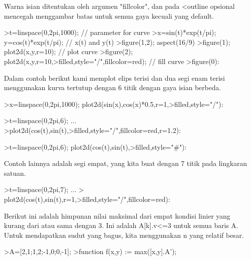 \documentclass{article}
\begin{document}
\begin{eulernotebook}
\begin{eulercomment}
\begin{eulercomment}
\begin{eulercomment}
\begin{eulercomment}
\begin{eulercomment}
Warna isian ditentukan oleh argumen "fillcolor", dan pada \textless{}outline
opsional mencegah menggambar batas untuk semua gaya kecuali yang
default.
\end{eulercomment}
\begin{eulerprompt}
>t=linspace(0,2pi,1000); // parameter for curve
>x=sin(t)*exp(t/pi); y=cos(t)*exp(t/pi); // x(t) and y(t)
>figure(1,2); aspect(16/9)
>figure(1); plot2d(x,y,r=10); // plot curve
>figure(2); plot2d(x,y,r=10,>filled,style="/",fillcolor=red); // fill curve
>figure(0):
\end{eulerprompt}
\begin{eulercomment}
Dalam contoh berikut kami memplot elips terisi dan dua segi enam
terisi menggunakan kurva tertutup dengan 6 titik dengan gaya isian
berbeda.
\end{eulercomment}
\begin{eulerprompt}
>x=linspace(0,2pi,1000); plot2d(sin(x),cos(x)*0.5,r=1,>filled,style="/"):
\end{eulerprompt}
\begin{eulerprompt}
>t=linspace(0,2pi,6); ...
>plot2d(cos(t),sin(t),>filled,style="/",fillcolor=red,r=1.2):
\end{eulerprompt}
\begin{eulerprompt}
>t=linspace(0,2pi,6); plot2d(cos(t),sin(t),>filled,style="#"):
\end{eulerprompt}
\begin{eulercomment}
Contoh lainnya adalah segi empat, yang kita buat dengan 7 titik pada
lingkaran satuan.
\end{eulercomment}
\begin{eulerprompt}
>t=linspace(0,2pi,7);  ...
> plot2d(cos(t),sin(t),r=1,>filled,style="/",fillcolor=red):
\end{eulerprompt}
\begin{eulercomment}
Berikut ini adalah himpunan nilai maksimal dari empat kondisi linier
yang kurang dari atau sama dengan 3. Ini adalah A[k].v\textless{}=3 untuk semua
baris A. Untuk mendapatkan sudut yang bagus, kita menggunakan n yang
relatif besar.
\end{eulercomment}
\begin{eulerprompt}
>A=[2,1;1,2;-1,0;0,-1];
>function f(x,y) := max([x,y].A');

\end{eulerprompt}
\end{eulercomment}
\end{eulercomment}
\end{eulercomment}
\end{eulercomment}
\end{eulernotebook}
\end{document}
